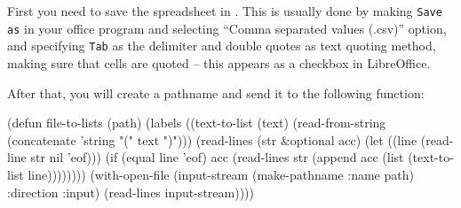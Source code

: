 \documentclass[a4paper,11pt]{article}
\begin{document}
\begin{uenum}

\item First you need to save the spreadsheet in . This is usually done by making \Verb+Save as+ in your office program and selecting ``Comma separated values (.csv)'' option, and specifying \Verb+Tab+ as the delimiter and double quotes as text quoting method, making sure that cells are quoted -- this appears as a checkbox in LibreOffice.

\item After that, you will create a pathname and send it to the following function:

{\small
\begin{lispcode}
(defun file-to-lists (path)
  (labels ((text-to-list (text)
						 (read-from-string 
						   (concatenate 'string "(" text ")")))
		   (read-lines (str &optional acc)
					   (let ((line (read-line str nil 'eof)))
						 (if (equal line 'eof)
						   acc
						   (read-lines 
							 str 
							 (append
							   acc
							   (list (text-to-list line))))))))
	(with-open-file (input-stream 
					  (make-pathname :name path)
					  :direction :input)
	  (read-lines input-stream))))
\end{lispcode}
}
\end{uenum}

\newpage


\end{document}

